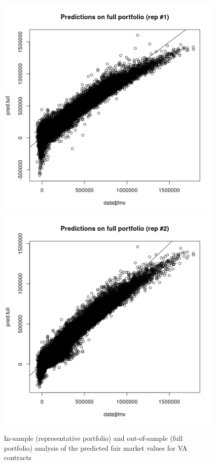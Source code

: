 \begin{figure}[h!]
{\includegraphics[scale=0.4]{pictures/original_predictions_full_portfolio_rep1}\includegraphics[scale=0.4]{pictures/original_predictions_full_portfolio_rep2} 
}
\caption{In-sample (representative portfolio) and out-of-sample (full portfolio) analysis of the predicted fair market values for VA contracts}\label{prediction_fmv}
\end{figure}

